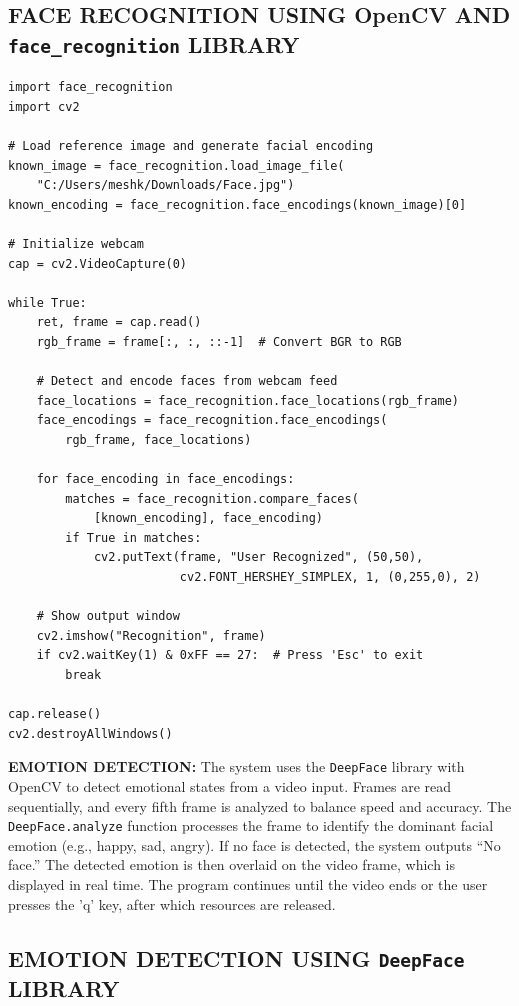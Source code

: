 \subsection*{FACE RECOGNITION USING OpenCV AND \texttt{face\_recognition} LIBRARY}

\begin{verbatim}
import face_recognition
import cv2

# Load reference image and generate facial encoding
known_image = face_recognition.load_image_file(
    "C:/Users/meshk/Downloads/Face.jpg")
known_encoding = face_recognition.face_encodings(known_image)[0]

# Initialize webcam
cap = cv2.VideoCapture(0)

while True:
    ret, frame = cap.read()
    rgb_frame = frame[:, :, ::-1]  # Convert BGR to RGB
    
    # Detect and encode faces from webcam feed
    face_locations = face_recognition.face_locations(rgb_frame)
    face_encodings = face_recognition.face_encodings(
        rgb_frame, face_locations)

    for face_encoding in face_encodings:
        matches = face_recognition.compare_faces(
            [known_encoding], face_encoding)
        if True in matches:
            cv2.putText(frame, "User Recognized", (50,50), 
                        cv2.FONT_HERSHEY_SIMPLEX, 1, (0,255,0), 2)

    # Show output window
    cv2.imshow("Recognition", frame)
    if cv2.waitKey(1) & 0xFF == 27:  # Press 'Esc' to exit
        break

cap.release()
cv2.destroyAllWindows()
\end{verbatim}


\textbf{EMOTION DETECTION:}  
The system uses the \texttt{DeepFace} library with OpenCV to detect emotional states from a video input. Frames are read sequentially, and every fifth frame is analyzed to balance speed and accuracy. The \texttt{DeepFace.analyze} function processes the frame to identify the dominant facial emotion (e.g., happy, sad, angry). If no face is detected, the system outputs ``No face.'' The detected emotion is then overlaid on the video frame, which is displayed in real time. The program continues until the video ends or the user presses the 'q' key, after which resources are released.

\subsection*{EMOTION DETECTION USING \texttt{DeepFace} LIBRARY}

